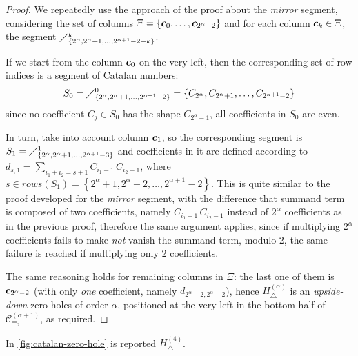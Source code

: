 \begin{proof}
We repeatedly use the approach
of the proof about the \emph{mirror} segment, considering the set of columns
$\Xi=\lbrace \boldsymbol{c}_{0},\ldots, \boldsymbol{c}_{2^{{\alpha}}-2}\rbrace$ and
for each column $\boldsymbol{c}_{k}\in\Xi$, the segment
    $\diagup_{\lbrace 2^{\alpha},2^{\alpha}+1,\ldots,2^{\alpha+1}-2-k\rbrace}^{k}$.

If we start from the column $\boldsymbol{c}_{0}$ on the very left,
then the corresponding set of row indices is a segment of Catalan numbers:
\begin{displaymath}
    S_{0}=\diagup_{\lbrace 2^{\alpha},2^{\alpha}+1,\ldots,2^{\alpha+1}-2\rbrace}^{0}
        = \lbrace C_{2^{\alpha}},C_{2^{\alpha}+1},\ldots,C_{2^{\alpha+1}-2}\rbrace
\end{displaymath}
since no coefficient $C_{j}\in S_{0}$ has the shape $C_{2^{\alpha}-1}$,
all coefficients in $S_{0}$ are even.

In turn, take into account column $\boldsymbol{c}_{1}$, so the corresponding segment is
    $S_{1}=\diagup_{\lbrace 2^{\alpha},2^{\alpha}+1,\ldots,2^{\alpha+1}-3\rbrace}^{1}$
and coefficients in it are defined according to
$d_{s, 1} = \sum_{i_{1}+i_{2}=s+1} {C_{i_{1}-1}\,C_{i_{2}-1}}$,
where $s\in rows(S_{1})= \left\lbrace 2^{\alpha}+1,2^{\alpha}+2,\ldots,2^{\alpha+1}-2\right\rbrace$.
This is quite similar to the proof developed for the \emph{mirror} segment,
with the difference that summand term is composed of two coefficients, namely
$C_{i_{1}-1}\,C_{i_{2}-1}$ instead of $2^{{\alpha}}$ coefficients as in the previous proof,
therefore the same argument applies,
since if multiplying $2^{{\alpha}}$ coefficients fails to make \emph{not} vanish
the summand term, modulo $2$, the same failure is reached if multiplying only $2$ coefficients.

The same reasoning holds for remaining columns in $\Xi$: the last one of them is
$\boldsymbol{c}_{2^{\alpha}-2}$ (with only \emph{one} coefficient, namely $d_{2^{\alpha}-2,2^{\alpha}-2}$),
hence $H_{\bigtriangleup}^{({\alpha})}$ is an \emph{upside-down} zero-holes of order $\alpha$,
positioned at the very left in the bottom half of $\mathcal{C}_{\equiv_{2}}^{(\alpha+1)}$, as required.

\end{proof}


In \autoref{fig:catalan-zero-hole} is reported $H_{\bigtriangleup}^{(4)}$.

